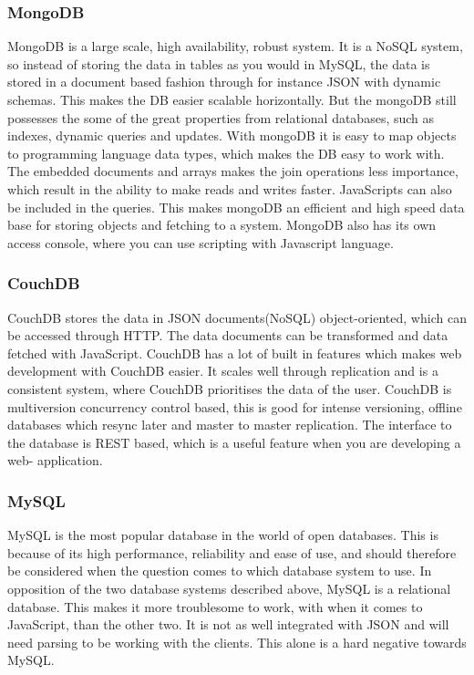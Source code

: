 \subsubsection*{MongoDB}
MongoDB is a large scale, high availability, robust system. It is a NoSQL system, so instead of storing the data in tables as you would in MySQL, the data is stored in a document based fashion through for instance JSON with dynamic schemas. This makes the DB easier scalable horizontally. But the mongoDB still possesses the some of the great properties from relational databases, such as indexes, dynamic queries and updates. With mongoDB it is easy to map objects to programming language data types, which makes the DB easy to work with. The embedded documents and arrays makes the join operations less importance, which result in the ability to make reads and writes faster. JavaScripts can also be included in the queries. This makes mongoDB an efficient and high speed data base for storing objects and fetching to a system. MongoDB also has its own access console, where you can use scripting with Javascript language. \cite{mongodb-intro}

\subsubsection*{CouchDB}
CouchDB stores the data in JSON documents(NoSQL) object-oriented, which can be accessed through HTTP. The data documents can be transformed and data fetched with JavaScript. CouchDB has a lot of built in features which makes web development with CouchDB easier. It scales well through replication and is a consistent system, where CouchDB prioritises the data of the user. CouchDB is multiversion concurrency control based, this is good for intense versioning, offline databases which resync later and master to master replication. The interface to the database is REST based, which is a useful feature when you are developing a web- application.
\cite{couchdb-about, couchdb-technical}

\subsubsection*{MySQL}
MySQL is the most popular database in the world of open databases. This is because of its high performance, reliability and ease of use, and should therefore be considered when the question comes to which database system to use. In opposition of the two database systems described above, MySQL is a relational database. This makes it more troublesome to work, with when it comes to JavaScript, than the other two. It is not as well integrated with JSON and will need parsing to be working with the clients. This alone is a hard negative towards MySQL.
\cite{mysql-about}


